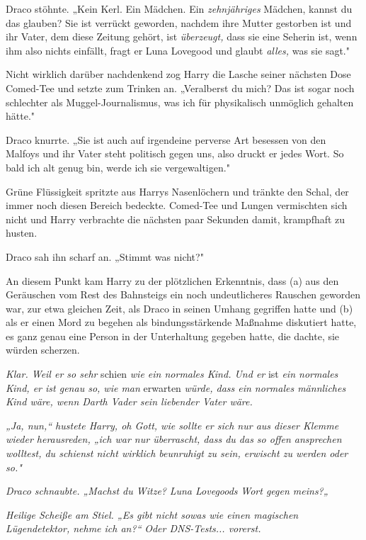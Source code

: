 {Draco stöhnte. „Kein Kerl. Ein Mädchen. Ein \emph{zehnjähriges} Mädchen, kannst du das glauben? Sie ist verrückt geworden, nachdem ihre Mutter gestorben ist und ihr Vater, dem diese Zeitung gehört, ist \emph{überzeugt,} dass sie eine Seherin ist, wenn ihm also nichts einfällt, fragt er Luna Lovegood und glaubt \emph{alles,} was sie sagt."

Nicht wirklich darüber nachdenkend zog Harry die Lasche seiner nächsten Dose Comed-Tee und setzte zum Trinken an. „Veralberst du mich? Das ist sogar noch schlechter als Muggel-Journalismus, was ich für physikalisch unmöglich gehalten hätte."

Draco knurrte. „Sie ist auch auf irgendeine perverse Art besessen von den Malfoys und ihr Vater steht politisch gegen uns, also druckt er jedes Wort. So bald ich alt genug bin, werde ich sie vergewaltigen."

Grüne Flüssigkeit spritzte aus Harrys Nasenlöchern und tränkte den Schal, der immer noch diesen Bereich bedeckte. Comed-Tee und Lungen vermischten sich nicht und Harry verbrachte die nächsten paar Sekunden damit, krampfhaft zu husten.

Draco sah ihn scharf an. „Stimmt was nicht?"

An diesem Punkt kam Harry zu der plötzlichen Erkenntnis, dass (a) aus den Geräuschen vom Rest des Bahnsteigs ein noch undeutlicheres Rauschen geworden war, zur etwa gleichen Zeit, als Draco in seinen Umhang gegriffen hatte und (b) als er einen Mord zu begehen als bindungsstärkende Maßnahme diskutiert hatte, es ganz genau eine Person in der Unterhaltung gegeben hatte, die dachte, sie würden scherzen.

\emph{Klar. Weil er so sehr} schien \emph{wie ein normales Kind. Und er} ist \emph{ein normales Kind, er ist genau so, wie man} erwarten \emph{würde, dass ein normales männliches Kind wäre, wenn Darth Vader sein liebender Vater wäre.}

\emph{„Ja, nun,“ hustete Harry, oh Gott, wie sollte er sich nur aus dieser Klemme wieder herausreden, „ich war nur überrascht, dass du das so offen ansprechen wolltest, du schienst nicht wirklich beunruhigt zu sein, erwischt zu werden oder so."}

\emph{Draco schnaubte. „Machst du Witze?} \emph{\emph{Luna Lovegoods}} \emph{Wort gegen meins?„}

\emph{Heilige Scheiße am Stiel. „Es gibt nicht sowas wie einen magischen} \emph{Lügendetektor, nehme ich an?“} \emph{\emph{Oder DNS-Tests... vorerst.}}

}
